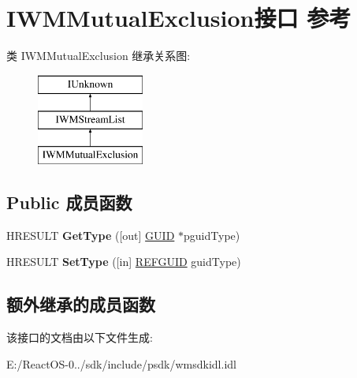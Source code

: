 \hypertarget{interface_i_w_m_mutual_exclusion}{}\section{I\+W\+M\+Mutual\+Exclusion接口 参考}
\label{interface_i_w_m_mutual_exclusion}
类 I\+W\+M\+Mutual\+Exclusion 继承关系图\+:\begin{figure}[H]
\begin{center}
\leavevmode
\includegraphics[height=3.000000cm]{interface_i_w_m_mutual_exclusion}
\end{center}
\end{figure}
\subsection*{Public 成员函数}
\begin{DoxyCompactItemize}
\item 
\mbox{\label{interface_i_w_m_mutual_exclusion_a3b76a7401178af902e44a6b14d2a34cb}} 
H\+R\+E\+S\+U\+LT {\bfseries Get\+Type} (\mbox{[}out\mbox{]} \hyperlink{interface_g_u_i_d}{G\+U\+ID} $\ast$pguid\+Type)
\item 
\mbox{\label{interface_i_w_m_mutual_exclusion_a1eb0878d4fd0f1d346d674bd17e2eddb}} 
H\+R\+E\+S\+U\+LT {\bfseries Set\+Type} (\mbox{[}in\mbox{]} \hyperlink{struct___g_u_i_d}{R\+E\+F\+G\+U\+ID} guid\+Type)
\end{DoxyCompactItemize}
\subsection*{额外继承的成员函数}


该接口的文档由以下文件生成\+:\begin{DoxyCompactItemize}
\item 
E\+:/\+React\+O\+S-\/0../sdk/include/psdk/wmsdkidl.\+idl\end{DoxyCompactItemize}
